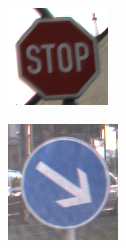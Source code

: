 \begin{figure}[H]
   \centering
   \begin{subfigure}[b]{0.125\textwidth}
       \centering
       \includegraphics[height=\textwidth]{../images/GTSRB/00093.png}
       \caption{}
       \label{fig:gtrsb-paper-bsp-image-1}
   \end{subfigure}
   \hspace{3em}%
   \begin{subfigure}[b]{0.125\textwidth}
       \centering
       \includegraphics[height=\textwidth]{../images/GTSRB/00847.png}

\end{subfigure}
\end{figure}
